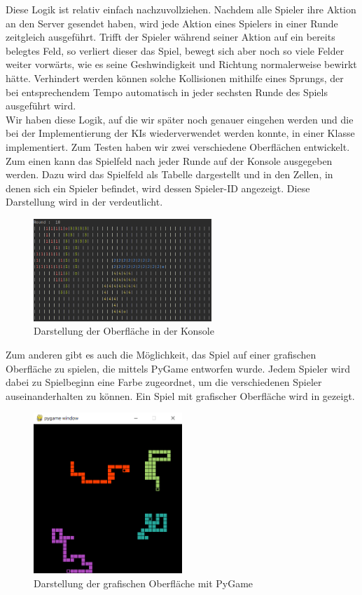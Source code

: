 Diese Logik ist relativ einfach nachzuvollziehen.
Nachdem alle Spieler ihre Aktion an den Server gesendet haben, wird jede Aktion eines Spielers in einer Runde zeitgleich
ausgeführt.
Trifft der Spieler während seiner Aktion auf ein bereits belegtes Feld, so verliert dieser das Spiel, bewegt sich
aber noch so viele Felder weiter vorwärts, wie es seine Geshwindigkeit und Richtung normalerweise bewirkt hätte.
Verhindert werden können solche Kollisionen mithilfe eines Sprungs, der bei entsprechendem Tempo automatisch in jeder
sechsten Runde des Spiels ausgeführt wird. \\

Wir haben diese Logik, auf die wir später noch genauer eingehen werden und die bei der Implementierung der \ac{KI}s
wiederverwendet werden konnte, in einer Klasse  implementiert.
Zum Testen haben wir zwei verschiedene Oberflächen entwickelt.
Zum einen kann das Spielfeld nach jeder Runde auf der Konsole ausgegeben werden.
Dazu wird das Spielfeld als Tabelle dargestellt und in den Zellen, in denen sich ein Spieler befindet, wird dessen
Spieler-ID angezeigt.
Diese Darstellung wird in der  verdeutlicht.

\begin{figure}[htb]
\centering
\includegraphics[width=0.6\textwidth]{Bilder/KonsolenOberflaeche.png}
\caption{Darstellung der Oberfläche in der Konsole}
\label{fig:KonsolenOberflaeche}
\end{figure}

Zum anderen gibt es auch die Möglichkeit, das Spiel auf einer grafischen Oberfläche zu spielen, die mittels PyGame
 entworfen wurde.
Jedem Spieler wird dabei zu Spielbeginn eine Farbe zugeordnet, um die verschiedenen Spieler auseinanderhalten zu können.
Ein Spiel mit grafischer Oberfläche wird in  gezeigt.

\begin{figure}[htb]
\centering
\includegraphics[width=0.5\textwidth]{Bilder/GrafischeOberflaeche.png}
\caption{Darstellung der grafischen Oberfläche mit PyGame}
\label{fig:GrafischeOberflaeche}
\end{figure}